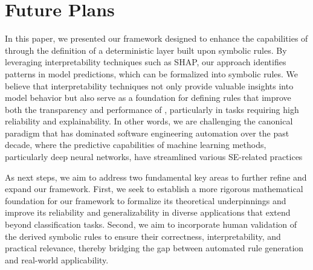 \section{Future Plans}
\label{sec:future_plan}

In this paper, we presented our framework designed to enhance the capabilities of \lcms through the definition of a deterministic layer built upon symbolic rules. By leveraging interpretability techniques such as SHAP, our approach identifies patterns in model predictions, which can be formalized into symbolic rules. We believe that interpretability techniques not only provide valuable insights into model behavior but also serve as a foundation for defining rules that improve both the transparency and performance of \lcms, particularly in tasks requiring high reliability and explainability. In other words, we are challenging the canonical paradigm that has dominated software engineering automation over the past decade, where the predictive capabilities of machine learning methods, particularly deep neural networks, have streamlined various SE-related practices


As next steps, we aim to address two fundamental key areas to further refine and expand our framework. First, we seek to establish a more rigorous mathematical foundation for our framework to formalize its theoretical underpinnings and improve its reliability and generalizability in diverse applications that extend beyond classification tasks. 
Second,  we aim to incorporate human validation of the derived symbolic rules to ensure their correctness, interpretability, and practical relevance, thereby bridging the gap between automated rule generation and real-world applicability.




